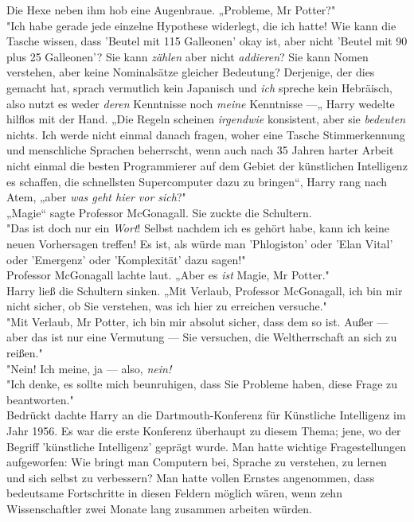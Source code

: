 {Die Hexe neben ihm hob eine Augenbraue. „Probleme, Mr Potter?"\\ "Ich habe gerade jede einzelne Hypothese widerlegt, die ich hatte! Wie kann die Tasche wissen, dass 'Beutel mit 115 Galleonen' okay ist, aber nicht 'Beutel mit 90 plus 25 Galleonen'? Sie kann \emph{zählen} aber nicht \emph{addieren}? Sie kann Nomen verstehen, aber keine Nominalsätze gleicher Bedeutung? Derjenige, der dies gemacht hat, sprach vermutlich kein Japanisch und \emph{ich} spreche kein Hebräisch, also nutzt es weder \emph{deren} Kenntnisse noch \emph{meine} Kenntnisse ---„ Harry wedelte hilflos mit der Hand. „Die Regeln scheinen \emph{irgendwie} konsistent, aber sie \emph{bedeuten} nichts. Ich werde nicht einmal danach fragen, woher eine Tasche Stimmerkennung und menschliche Sprachen beherrscht, wenn auch nach 35 Jahren harter Arbeit nicht einmal die besten Programmierer auf dem Gebiet der künstlichen Intelligenz es schaffen, die schnellsten Supercomputer dazu zu bringen“, Harry rang nach Atem, „aber \emph{was geht hier vor sich}?"\\ „Magie“ sagte Professor McGonagall. Sie zuckte die Schultern.\\ "Das ist doch nur ein \emph{Wort}! Selbst nachdem ich es gehört habe, kann ich keine neuen Vorhersagen treffen! Es ist, als würde man 'Phlogiston' oder 'Elan Vital' oder 'Emergenz' oder 'Komplexität' dazu sagen!"\\ Professor McGonagall lachte laut. „Aber es \emph{ist} Magie, Mr Potter."\\ Harry ließ die Schultern sinken. „Mit Verlaub, Professor McGonagall, ich bin mir nicht sicher, ob Sie verstehen, was ich hier zu erreichen versuche."\\ "Mit Verlaub, Mr Potter, ich bin mir absolut sicher, dass dem so ist. Außer --- aber das ist nur eine Vermutung --- Sie versuchen, die Weltherrschaft an sich zu reißen."\\ "Nein! Ich meine, ja --- also, \emph{nein!}\\ "Ich denke, es sollte mich beunruhigen, dass Sie Probleme haben, diese Frage zu beantworten."\\ Bedrückt dachte Harry an die Dartmouth-Konferenz für Künstliche Intelligenz im Jahr 1956. Es war die erste Konferenz überhaupt zu diesem Thema; jene, wo der Begriff 'künstliche Intelligenz' geprägt wurde. Man hatte wichtige Fragestellungen aufgeworfen: Wie bringt man Computern bei, Sprache zu verstehen, zu lernen und sich selbst zu verbessern? Man hatte vollen Ernstes angenommen, dass bedeutsame Fortschritte in diesen Feldern möglich wären, wenn zehn Wissenschaftler zwei Monate lang zusammen arbeiten würden.

}
